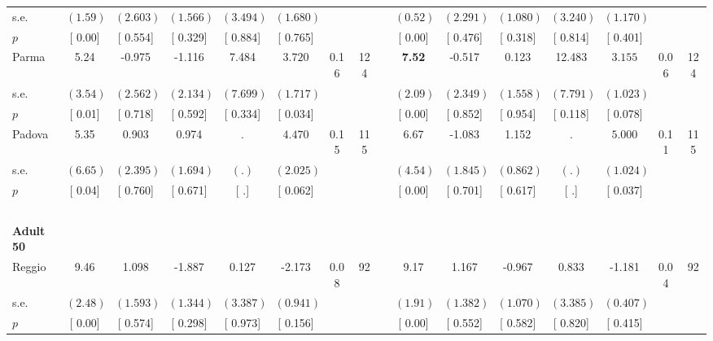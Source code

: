 \begin{longtable}{L{8em} c c c c c c c p{1em} c c c c c c c}
\quad \quad \quad \quad s.e.& $ (     1.59)$ & $ (    2.603)$ & $ (    1.566)$ & $ (    3.494)$ & $ (    1.680)$ & & & & $ (     0.52)$ & $ (    2.291)$ & $ (    1.080)$ & $ (    3.240)$ & $ (    1.170)$ & &  \\*
\quad \quad \quad \quad $ p$ & [     0.00] & [    0.554] & [    0.329] & [    0.884] & [    0.765] & & & & [     0.00] & [    0.476] & [    0.318] & [    0.814] & [    0.401] & &  \\[1em]
\quad \quad \quad Parma& 5.24 &    -0.975 &    -1.116 &     7.484 & $ \mathbf{    3.720}$ &      0.16 &       124 & & \textbf{     7.52} &    -0.517 &     0.123 &    12.483 & $ \mathbf{    3.155}$ &      0.06 &       124  \\*
\quad \quad \quad \quad s.e.& $ (     3.54)$ & $ (    2.562)$ & $ (    2.134)$ & $ (    7.699)$ & $ (    1.717)$ & & & & $ (     2.09)$ & $ (    2.349)$ & $ (    1.558)$ & $ (    7.791)$ & $ (    1.023)$ & &  \\*
\quad \quad \quad \quad $ p$ & [     0.01] & [    0.718] & [    0.592] & [    0.334] & [    0.034] & & & & [     0.00] & [    0.852] & [    0.954] & [    0.118] & [    0.078] & &  \\[1em]
\quad \quad \quad Padova& 5.35 &     0.903 &     0.974 &         . & $ \mathbf{    4.470}$ &      0.15 &       115 & & 6.67 &    -1.083 &     1.152 &         . & $ \mathbf{    5.000}$ &      0.11 &       115  \\*
\quad \quad \quad \quad s.e.& $ (     6.65)$ & $ (    2.395)$ & $ (    1.694)$ & $ (        .)$ & $ (    2.025)$ & & & & $ (     4.54)$ & $ (    1.845)$ & $ (    0.862)$ & $ (        .)$ & $ (    1.024)$ & &  \\*
\quad \quad \quad \quad $ p$ & [     0.04] & [    0.760] & [    0.671] & [        .] & [    0.062] & & & & [     0.00] & [    0.701] & [    0.617] & [        .] & [    0.037] & &  \\[1em]
~\\[1em]
\quad \quad \textbf{Adult 50} & & & & & & & & & & & & & & & \\* 
\quad \quad \quad Reggio& 9.46 &     1.098 &    -1.887 &     0.127 &    -2.173 &      0.08 &        92 & & 9.17 &     1.167 &    -0.967 &     0.833 &    -1.181 &      0.04 &        92  \\*
\quad \quad \quad \quad s.e.& $ (     2.48)$ & $ (    1.593)$ & $ (    1.344)$ & $ (    3.387)$ & $ (    0.941)$ & & & & $ (     1.91)$ & $ (    1.382)$ & $ (    1.070)$ & $ (    3.385)$ & $ (    0.407)$ & &  \\*
\quad \quad \quad \quad $ p$ & [     0.00] & [    0.574] & [    0.298] & [    0.973] & [    0.156] & & & & [     0.00] & [    0.552] & [    0.582] & [    0.820] & [    0.415] & &  \\[1em]

\end{longtable}
